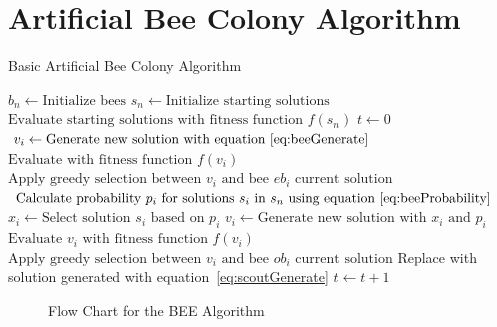 \section{Artificial Bee Colony Algorithm}
\label{sec:BEE}
\begin{algorithm}
\caption{Basic Artificial Bee Colony Algorithm}
\label{alg:ABC}
	\begin{algorithmic}[1]
		\STATE$b_n \leftarrow \text{Initialize bees}$
		\STATE$s_n \leftarrow \text{Initialize starting solutions}$
		\STATE$\text{Evaluate starting solutions with fitness function $f(s_n)$}$
		\STATE$t \leftarrow 0$
				\STATE$v_i \leftarrow \text{Generate new solution with equation~\ref{eq:beeGenerate}}$
				\STATE$\text{Evaluate with fitness function $f(v_i)$}$
				\STATE$\text{Apply greedy selection between $v_i$ and bee $eb_i$ current solution}$
			\ENDFOR
			\STATE$\text{Calculate probability $p_i$ for solutions $s_i$ in $s_n$ using equation~\ref{eq:beeProbability}}$
				\STATE$x_i \leftarrow \text{Select solution $s_i$ based on $p_i$} $
				\STATE$v_i \leftarrow \text{Generate new solution with $x_i$ and $p_i$}$
				\STATE$\text{Evaluate $v_i$ with fitness function $f(v_i)$}$
				\STATE$\text{Apply greedy selection between $v_i$ and bee $ob_i$ current solution}$
			\ENDFOR
				\STATE Replace with solution generated with equation~\ref{eq:scoutGenerate}
			\ENDIF
			\STATE$t \leftarrow t + 1$
		\ENDWHILE
	\end{algorithmic}
\end{algorithm}
\begin{figure}[p]
	\begin{center}
	\caption{Flow Chart for the BEE Algorithm}
	\label{fig:BeeAlgorithmFlowChart}
	\end{center}
\end{figure}
